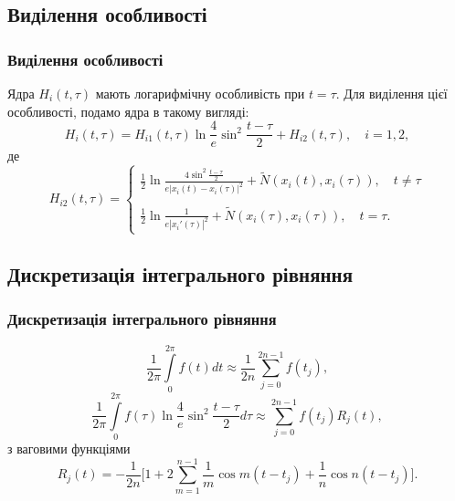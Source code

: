 \documentclass[10pt]{beamer}
\begin{document}
\subsection{Виділення особливості}
\begin{frame}
\frametitle{Виділення особливості}
Ядра $H_{i}(t,\tau)$ мають логарифмічну особливість при $t=\tau$. Для виділення цієї особливості, подамо ядра в такому вигляді:
\begin{equation*}
H_{i}(t,\tau)=H_{i1}(t,\tau)\ln{\frac{4}{e}\sin^2\frac{t-\tau}{2}}+H_{i2}(t,\tau), \quad i=1,2,
\end{equation*}
де
\begin{equation*}
H_{i2}(t,\tau)=\left\{
\begin{array}{l}
\displaystyle
\frac{1}{2}\ln{\frac{4\sin^2\frac{t-\tau}{2}}{e|x_{i}(t)-x_{i}(\tau)|^2}}+\tilde{N}(x_{i}(t),x_{i}(\tau)), \quad t\neq\tau\\ \\
\displaystyle
\frac{1}{2}\ln{\frac{1}{e|x_{i}'(\tau)|^2}}+\tilde{N}(x_{i}(\tau),x_{i}(\tau)), \quad t=\tau.
\end{array}
\right.
\end{equation*}
\end{frame}


\subsection{Дискретизація інтегрального рівняння}
\begin{frame}
\frametitle{Дискретизація інтегрального рівняння}
\begin{equation*}
\displaystyle
\frac{1}{2\pi}\int\limits_{0}^{2\pi}f(t)dt\approx
\frac{1}{2n}\sum\limits_{j=0}^{2n-1}f(t_{j}),
\end{equation*}
\begin{equation*}
\displaystyle
\frac{1}{2\pi}\int\limits_{0}^{2\pi}f(\tau)\ln{\frac{4}{e}\sin^2\frac{t-\tau}{2}}d\tau\approx\sum\limits_{j=0}^{2n-1}f(t_{j})R_{j}(t),
\end{equation*}
з ваговими функціями
\begin{equation*}
\displaystyle
R_{j}(t) = -\frac{1}{2n}\Big[1+2\sum\limits_{m=1}^{n-1}{\frac{1}{m}\cos{m(t-t_{j})}} + \frac{1}{n}\cos{n(t-t_{j})}\Big].
\end{equation*}
\end{frame}
\end{document}
